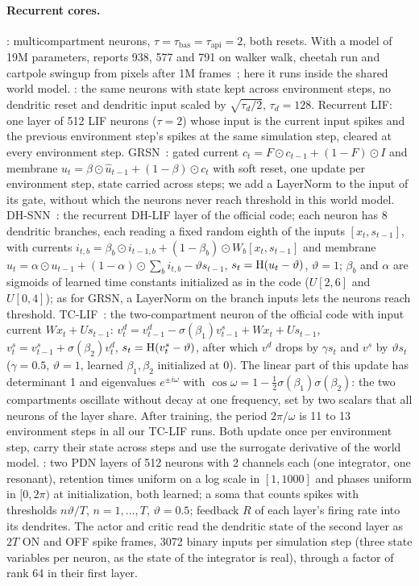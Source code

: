 \paragraph{Recurrent cores.}
\swm: multicompartment neurons, $\tau=\tau_{\mathrm{bas}}=\tau_{\mathrm{api}}=2$, both resets. With a model of 19M parameters, \swm reports 938, 577 and 791 on walker walk, cheetah run and cartpole swingup from pixels after 1M frames~\cite{sun2025spikingwm}; here it runs inside the shared world model.
\swmnr: the same neurons with state kept across environment steps, no dendritic reset and dendritic input scaled by $\sqrt{\tau_d/2}$, $\tau_d=128$.
Recurrent LIF: one layer of 512 LIF neurons ($\tau=2$) whose input is the current input spikes and the previous environment step's spikes at the same simulation step, cleared at every environment step.
GRSN~\cite{qin2025grsn}: gated current $c_t=F\odot c_{t-1}+(1-F)\odot I$ and membrane $u_t=\beta\odot\hat u_{t-1}+(1-\beta)\odot c_t$ with soft reset, one update per environment step, state carried across steps; we add a LayerNorm to the input of its gate, without which the neurons never reach threshold in this world model.
DH-SNN~\cite{zheng2024dhsnn}: the recurrent DH-LIF layer of the official code; each neuron has 8 dendritic branches, each reading a fixed random eighth of the inputs $[x_t,s_{t-1}]$, with currents $i_{t,b}=\beta_b\odot i_{t-1,b}+(1-\beta_b)\odot W_b[x_t,s_{t-1}]$ and membrane $u_t=\alpha\odot u_{t-1}+(1-\alpha)\odot\sum_b i_{t,b}-\vartheta s_{t-1}$, $s_t=\mathrm{H}(u_t-\vartheta)$, $\vartheta=1$; $\beta_b$ and $\alpha$ are sigmoids of learned time constants initialized as in the code ($U[2,6]$ and $U[0,4]$); as for GRSN, a LayerNorm on the branch inputs lets the neurons reach threshold.
TC-LIF~\cite{zhang2024tclif}: the two-compartment neuron of the official code with input current $Wx_t+Us_{t-1}$: $v^d_t=v^d_{t-1}-\sigma(\beta_1)v^s_{t-1}+Wx_t+Us_{t-1}$, $v^s_t=v^s_{t-1}+\sigma(\beta_2)v^d_t$, $s_t=\mathrm{H}(v^s_t-\vartheta)$, after which $v^d$ drops by $\gamma s_t$ and $v^s$ by $\vartheta s_t$ ($\gamma=0.5$, $\vartheta=1$, learned $\beta_1,\beta_2$ initialized at 0).
The linear part of this update has determinant 1 and eigenvalues $e^{\pm i\omega}$ with $\cos\omega=1-\tfrac12\sigma(\beta_1)\sigma(\beta_2)$: the two compartments oscillate without decay at one frequency, set by two scalars that all neurons of the layer share.
After training, the period $2\pi/\omega$ is 11 to 13 environment steps in all our TC-LIF runs.
Both update once per environment step, carry their state across steps and use the surrogate derivative of the world model.
\method: two PDN layers of 512 neurons with 2 channels each (one integrator, one resonant), retention times uniform on a log scale in $[1,1000]$ and phases uniform in $[0,2\pi)$ at initialization, both learned; a soma that counts spikes with thresholds $n\vartheta/T$, $n=1,\dots,T$, $\vartheta=0.5$; feedback $R$ of each layer's firing rate into its dendrites. The actor and critic read the dendritic state of the second layer as $2T$ ON and OFF spike frames, 3072 binary inputs per simulation step (three state variables per neuron, as the state of the integrator is real), through a factor of rank 64 in their first layer.

